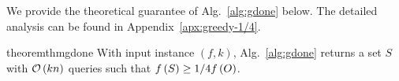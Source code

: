 




We provide the theoretical guarantee of Alg.~\ref{alg:gdone} below.
The detailed analysis can be found in Appendix~\ref{apx:greedy-1/4}.
\begin{restatable}{theorem}{thmgdone}\label{thm:gdone}
With input instance $(f, k)$, Alg.~\ref{alg:gdone} returns a set $S$ with $\mathcal O \left( kn \right)$ queries
such that $f \left( S \right) \ge 1/4 f \left( O \right)$.
\end{restatable}



